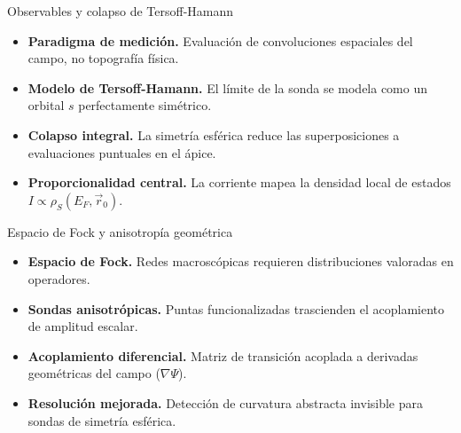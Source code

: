 \begin{frame}{Observables y colapso de Tersoff-Hamann}
  \begin{itemize}
    \item \textbf{Paradigma de medición.} Evaluación de convoluciones
    espaciales del campo, no topografía física.
    \item \textbf{Modelo de Tersoff-Hamann.} El límite de la sonda se modela
    como un orbital $s$ perfectamente simétrico.
    \item \textbf{Colapso integral.} La simetría esférica reduce las
    superposiciones a evaluaciones puntuales en el ápice.
    \item \textbf{Proporcionalidad central.} La corriente mapea la densidad
    local de estados $I \propto \rho_S(E_F, \vec{r}_0)$.
  \end{itemize}
\end{frame}

\begin{frame}{Espacio de Fock y anisotropía geométrica}
  \begin{itemize}
    \item \textbf{Espacio de Fock.} Redes macroscópicas requieren
    distribuciones valoradas en operadores.
    \item \textbf{Sondas anisotrópicas.} Puntas funcionalizadas trascienden
    el acoplamiento de amplitud escalar.
    \item \textbf{Acoplamiento diferencial.} Matriz de transición acoplada a
    derivadas geométricas del campo ($\nabla \Psi$).
    \item \textbf{Resolución mejorada.} Detección de curvatura abstracta
    invisible para sondas de simetría esférica.
  \end{itemize}
\end{frame}
